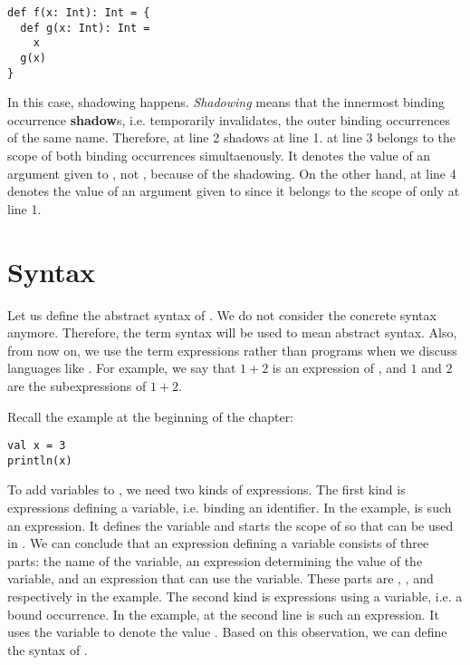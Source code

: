 \begin{verbatim}
def f(x: Int): Int = {
  def g(x: Int): Int =
    x
  g(x)
}
\end{verbatim}

In this case, shadowing happens. \textit{Shadowing} means that
the innermost binding occurrence \textbf{shadow}s, i.e. temporarily invalidates,
the outer binding occurrences of the same name. Therefore,  at line 2
shadows  at line 1.
 at line 3 belongs to the scope of both binding occurrences simultaenously.
It denotes the value of an argument given to , not , because of
the shadowing. On the other hand,  at line 4 denotes the value of an
argument given to  since it belongs to the scope of only  at
line 1.

\section{Syntax}

Let us define the abstract syntax of \lang. We do not consider the concrete
syntax anymore. Therefore, the term syntax will be used to mean abstract
syntax. Also, from now on, we use the term expressions rather than
programs when we discuss languages like \lang. For example, we say that
$1+2$ is an expression of \plang, and $1$ and $2$ are the subexpressions of
$1+2$.

Recall the example at the beginning of the chapter:

\begin{verbatim}
val x = 3
println(x)
\end{verbatim}

To add variables to \plang, we need two kinds of expressions. The first kind is
expressions defining a variable, i.e. binding an identifier. In the example,
 is such an expression. It defines the
variable  and starts the scope of  so that  can be used
in . We can conclude that an expression defining a variable
consists of three parts: the name of the variable, an expression determining the
value of the variable, and an expression that can use the variable. These parts
are , , and  respectively in the example. The
second kind is expressions using a variable, i.e. a bound occurrence. In the
example,  at the second line is such an expression. It uses the variable  to denote
the value . Based on this observation, we can define the syntax of
\lang.

